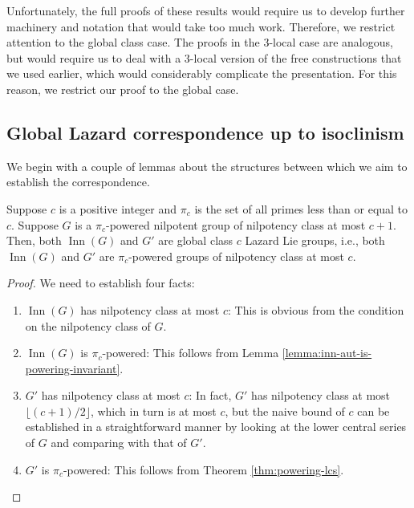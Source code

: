 \documentclass{ucetd}
\begin{document}
Unfortunately, the full proofs of these results would require us to
develop further machinery and notation that would take too much
work. Therefore, we restrict attention to the global class case. The
proofs in the $3$-local case are analogous, but would require us to
deal with a $3$-local version of the free constructions that we used
earlier, which would considerably complicate the presentation. For
this reason, we restrict our proof to the global case.

\subsection{Global Lazard correspondence up to isoclinism}\label{sec:glcuti-def}

We begin with a couple of lemmas about the structures between which we
aim to establish the correspondence.

\begin{lemma}
  Suppose $c$ is a positive integer and $\pi_c$ is the set of all
  primes less than or equal to $c$. Suppose $G$ is a $\pi_c$-powered
  nilpotent group of nilpotency class at most $c + 1$. Then, both
  $\operatorname{Inn}(G)$ and $G'$ are global class $c$ Lazard Lie
  groups, i.e., both $\operatorname{Inn}(G)$ and $G'$ are
  $\pi_c$-powered groups of nilpotency class at most $c$.
\end{lemma}

\begin{proof}
  We need to establish four facts:

  \begin{enumerate}
  \item $\operatorname{Inn}(G)$ has nilpotency class at most $c$: This
    is obvious from the condition on the nilpotency class of $G$.
  \item $\operatorname{Inn}(G)$ is $\pi_c$-powered: This follows from
    Lemma \ref{lemma:inn-aut-is-powering-invariant}.
  \item $G'$ has nilpotency class at most $c$: In fact, $G'$ has
    nilpotency class at most $\lfloor (c + 1)/2 \rfloor$, which in
    turn is at most $c$, but the naive bound of $c$ can be established
    in a straightforward manner by looking at the lower central series
    of $G$ and comparing with that of $G'$. %
  \item $G'$ is $\pi_c$-powered: This follows from Theorem
    \ref{thm:powering-lcs}.
  \end{enumerate}
\end{proof}
\end{document}
